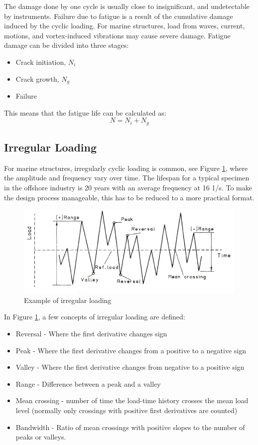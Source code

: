 \noindent The damage done by one cycle is usually close to insignificant, and undetectable by instruments. Failure due to fatigue is a result of the cumulative damage induced by the cyclic loading. For marine structures, load from waves, current, motions, and vortex-induced vibrations may cause severe damage. Fatigue damage can be divided into three stages:
 \begin{itemize}
     \item Crack initiation, $N_i$
     \item Crack growth, $N_g$
     \item Failure
 \end{itemize}
 This means that the fatigue life can be calculated as:
 \begin{equation}
     N=N_i+N_g
 \end{equation}
 
\subsection{Irregular Loading}
For marine structures, irregularly cyclic loading is common, see Figure \ref{fig:irr}, where the amplitude and frequency vary over time. The lifespan for a typical specimen in the offshore industry is 20 years with an average frequency at 16 1/s. To make the design process manageable, this has to be reduced to a more practical format.  

\begin{figure}[H]
\centering
\includegraphics[scale=0.8]{figures/irr}
\caption[$\; \:$Example of irregular loading]{Example of irregular loading  \cite{fatigue2016} }
 \label{fig:irr}
\end{figure}

In Figure \ref{fig:irr}, a few concepts of irregular loading are defined:
\begin{itemize}
\item Reversal - Where the first derivative changes sign
    \item Peak - Where the first derivative changes from a positive to a negative sign
    \item Valley - Where the first derivative changes from negative to a positive sign
    \item Range - Difference between a peak and a valley
    \item Mean crossing - number of time the load-time history crosses the mean load level (normally only crossings with positive first derivatives are counted)
    \item Bandwidth - Ratio of mean crossings with positive slopes to the number of peaks or valleys. 
\end{itemize}
 
